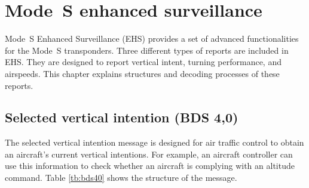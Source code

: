 \chapter{Mode~S enhanced surveillance}

Mode~S Enhanced Surveillance (EHS) provides a set of advanced functionalities for the Mode~S transponders. Three different types of reports are included in EHS. They are designed to report vertical intent, turning performance, and airspeeds. This chapter explains structures and decoding processes of these reports.

\section{Selected vertical intention (BDS 4,0)}

The selected vertical intention message is designed for air traffic control to obtain an aircraft's current vertical intentions. For example, an aircraft controller can use this information to check whether an aircraft is complying with an altitude command. Table \ref{tb:bds40} shows the structure of the message.

